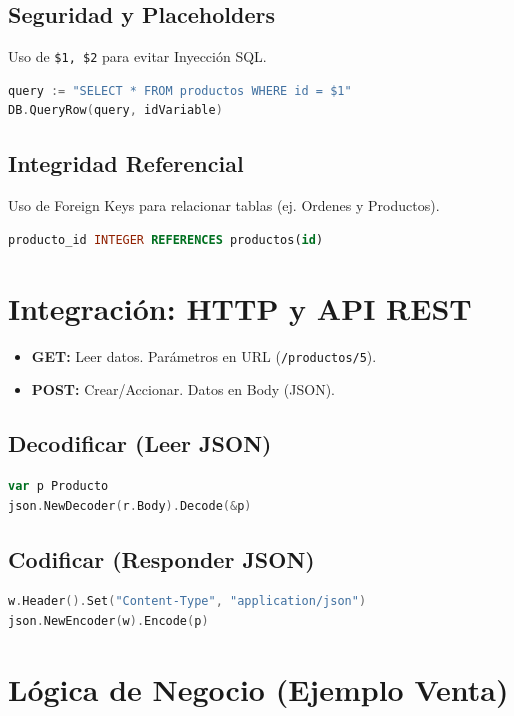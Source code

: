\documentclass[a4paper,12pt]{article}
\begin{document}
\subsection{Seguridad y Placeholders}
Uso de \texttt{\$1, \$2} para evitar Inyección SQL.

\begin{lstlisting}[language=Go]
query := "SELECT * FROM productos WHERE id = $1"
DB.QueryRow(query, idVariable)
\end{lstlisting}

\subsection{Integridad Referencial}
Uso de Foreign Keys para relacionar tablas (ej. Ordenes y Productos).
\begin{lstlisting}[language=SQL]
producto_id INTEGER REFERENCES productos(id)
\end{lstlisting}

\section{Integración: HTTP y API REST}

\begin{itemize}
    \item \textbf{GET:} Leer datos. Parámetros en URL (\texttt{/productos/5}).
    \item \textbf{POST:} Crear/Accionar. Datos en Body (JSON).
\end{itemize}

\subsection{Decodificar (Leer JSON)}
\begin{lstlisting}[language=Go]
var p Producto
json.NewDecoder(r.Body).Decode(&p)
\end{lstlisting}

\subsection{Codificar (Responder JSON)}
\begin{lstlisting}[language=Go]
w.Header().Set("Content-Type", "application/json")
json.NewEncoder(w).Encode(p)
\end{lstlisting}

\section{Lógica de Negocio (Ejemplo Venta)}
\end{document}

